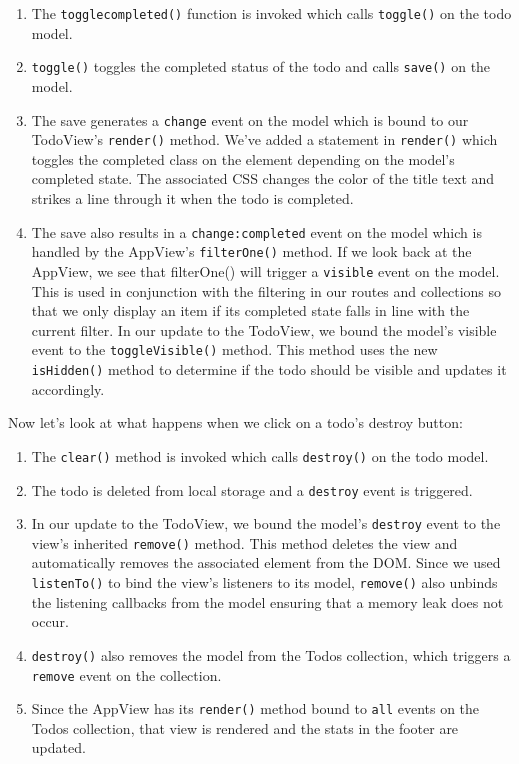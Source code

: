 \documentclass[9pt]{book}
\begin{document}
\begin{enumerate}
\def\labelenumi{\arabic{enumi}.}
\itemsep1pt\parskip0pt
\item
  The \texttt{togglecompleted()} function is invoked which calls
  \texttt{toggle()} on the todo model.
\item
  \texttt{toggle()} toggles the completed status of the todo and calls
  \texttt{save()} on the model.
\item
  The save generates a \texttt{change} event on the model which is bound
  to our TodoView's \texttt{render()} method. We've added a statement in
  \texttt{render()} which toggles the completed class on the element
  depending on the model's completed state. The associated CSS changes
  the color of the title text and strikes a line through it when the
  todo is completed.
\item
  The save also results in a \texttt{change:completed} event on the
  model which is handled by the AppView's \texttt{filterOne()} method.
  If we look back at the AppView, we see that filterOne() will trigger a
  \texttt{visible} event on the model. This is used in conjunction with
  the filtering in our routes and collections so that we only display an
  item if its completed state falls in line with the current filter. In
  our update to the TodoView, we bound the model's visible event to the
  \texttt{toggleVisible()} method. This method uses the new
  \texttt{isHidden()} method to determine if the todo should be visible
  and updates it accordingly.
\end{enumerate}

Now let's look at what happens when we click on a todo's destroy button:

\begin{enumerate}
\def\labelenumi{\arabic{enumi}.}
\itemsep1pt\parskip0pt
\item
  The \texttt{clear()} method is invoked which calls \texttt{destroy()}
  on the todo model.
\item
  The todo is deleted from local storage and a \texttt{destroy} event is
  triggered.
\item
  In our update to the TodoView, we bound the model's \texttt{destroy}
  event to the view's inherited \texttt{remove()} method. This method
  deletes the view and automatically removes the associated element from
  the DOM. Since we used \texttt{listenTo()} to bind the view's
  listeners to its model, \texttt{remove()} also unbinds the listening
  callbacks from the model ensuring that a memory leak does not occur.
\item
  \texttt{destroy()} also removes the model from the Todos collection,
  which triggers a \texttt{remove} event on the collection.
\item
  Since the AppView has its \texttt{render()} method bound to
  \texttt{all} events on the Todos collection, that view is rendered and
  the stats in the footer are updated.
\end{enumerate}
\end{document}
